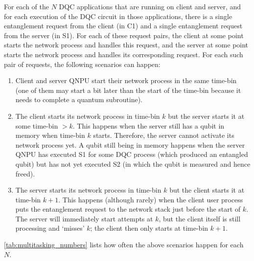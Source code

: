 For each of the $N$ \ac{DQC} applications that are running on client and server, and for each execution of the \ac{DQC} circuit in those applications, there is a single entanglement request from the client (in C1) and a single entanglement request from the server (in S1). For each of these request pairs, the client at some point starts the network process and handles this request, and the server at some point starts the network process and handles its corresponding request. For each such pair of requests, the following scenarios can happen:
%
\begin{enumerate}
    \item Client and server \ac{QNPU} start their network process in the same time-bin (one of them may start a bit later than the start of the time-bin because it needs to complete a quantum subroutine).
    \item The client starts its network process in time-bin $k$ but the server starts it at some time-bin $>k$. This happens when the server still has a qubit in memory when time-bin $k$ starts. Therefore, the server cannot activate its network process yet. A qubit still being in memory happens when the server \ac{QNPU} has executed S1 for some \ac{DQC} process (which produced an entangled qubit) but has not yet executed S2 (in which the qubit is measured and hence freed).
    \item The server starts its network process in time-bin $k$ but the client starts it at time-bin $k+1$. This happens (although rarely) when the client user process puts the entanglement request to the network stack just before the start of $k$. The server will immediately start attempts at $k$, but the client itself is still processing and `misses' $k$; the client then only starts at time-bin $k+1$.
\end{enumerate}

\cref{tab:multitasking_numbers} lists how often the above scenarios happen for each $N$.

